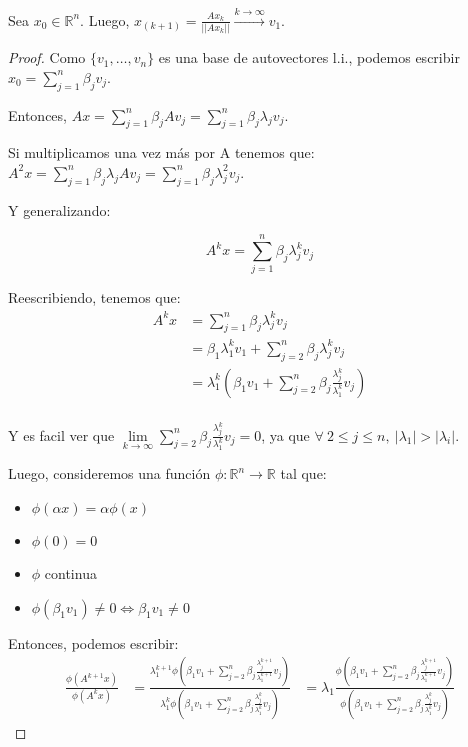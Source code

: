 \begin{proposition}
    Sea $x_0 \in \mathbb{R}^{n}$. Luego, $x_{(k+1)} = \frac{Ax_k}{||Ax_k||} \xrightarrow{k \to \infty} v_1$.
\end{proposition}
\begin{proof}

Como $\{v_1, \dots, v_n\}$ es una base de autovectores l.i., podemos escribir $x_0 = \sum\limits_{j=1}^{n}{\beta_j v_j}$.

Entonces, $Ax = \sum\limits_{j=1}^{n}{\beta_j A v_j} = \sum\limits_{j=1}^{n}{\beta_j \lambda_j v_j}$.

Si multiplicamos una vez más por A tenemos que: $A^2x = \sum\limits_{j=1}^{n}{\beta_j \lambda_j A v_j} = \sum\limits_{j=1}^{n}{\beta_j \lambda_j^2 v_j}$.

Y generalizando:

$$A^kx = \sum\limits_{j=1}^{n}{\beta_j \lambda_j^k v_j}$$

Reescribiendo, tenemos que:
\begin{equation*}
        \begin{aligned}
        A^kx &= \sum\limits_{j=1}^{n}{\beta_j \lambda_j^k v_j} \\
             &= \beta_1 \lambda_1^k v_1 +\sum\limits_{j=2}^{n}{\beta_j \lambda_j^k v_j} \\
             &= \lambda_1^k \left(\beta_1 v_1 +\sum\limits_{j=2}^{n}{\beta_j \frac{\lambda_j^k}{\lambda_1^k} v_j} \right) \\
        \end{aligned}
\end{equation*}

Y es facil ver que $\lim\limits_{k \to \infty} \sum\limits_{j=2}^{n}{\beta_j \frac{\lambda_j^k}{\lambda_1^k} v_j} = 0$,
ya que $\forall\ 2\leq j\leq n,\ |\lambda_1| > |\lambda_i|$.

Luego, consideremos una función $\phi:\mathbb{R}^{n}\to \mathbb{R}$ tal que:
\begin{itemize}
    \item $\phi(\alpha x) = \alpha \phi(x)$
    \item $\phi(0) = 0$
    \item $\phi$ continua
    \item $\phi(\beta_1 v_1) \neq 0 \iff \beta_1 v_1 \neq 0$
\end{itemize}

Entonces, podemos escribir:
\begin{equation*}
        \begin{aligned}
        \frac{\phi(A^{k+1}x)}{\phi(A^kx)}
            &= \frac{\lambda_1^{k+1} \phi\left(\beta_1 v_1 +\sum\limits_{j=2}^{n}{\beta_j \frac{\lambda_j^{k+1}}{\lambda_1^{k+1}} v_j} \right)}
                {\lambda_1^k \phi\left(\beta_1 v_1 +\sum\limits_{j=2}^{n}{\beta_j \frac{\lambda_j^k}{\lambda_1^k} v_j} \right)}
            &= \lambda_1\frac{\phi\left(\beta_1 v_1 +\sum\limits_{j=2}^{n}{\beta_j \frac{\lambda_j^{k+1}}{\lambda_1^{k+1}} v_j} \right)}
                    {\phi\left(\beta_1 v_1 +\sum\limits_{j=2}^{n}{\beta_j \frac{\lambda_j^k}{\lambda_1^k} v_j} \right)}
        \end{aligned}
\end{equation*}


\end{proof}
